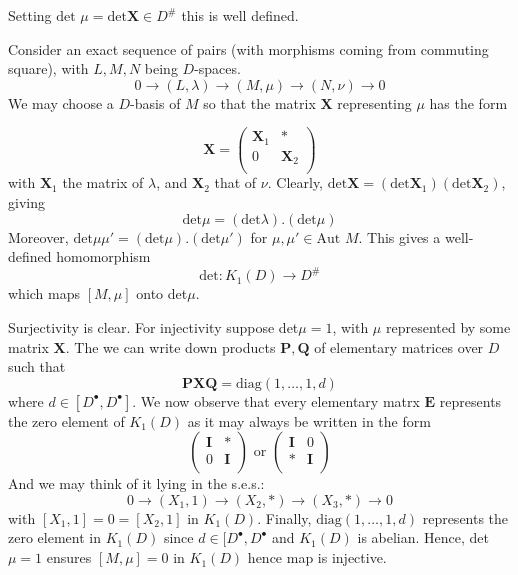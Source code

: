 Setting $\text{det }\mu = \text{det} \mathbf X \in D^{\#}$ this is well defined.

Consider an exact sequence of pairs (with morphisms coming from commuting square), with $L,M,N$ being $D$-spaces.
$$0\rightarrow (L, \lambda) \rightarrow (M, \mu) \rightarrow (N, \nu)\rightarrow 0$$
We may choose a $D$-basis of $M$ so that the matrix $\mathbf X$ representing $\mu$ has the form

$$\mathbf X = \left( \begin{array}{cc}
\mathbf X_1& *\\
0 & \mathbf X_2\\ \end{array}\right)$$
with $\mathbf X_1$ the matrix of $\lambda$, and $\mathbf X_2$ that of $\nu$. Clearly, $\text{det} \mathbf X = (\text{det} \mathbf X_1)(\text{det} \mathbf X_2)$, giving
$$\text{det} \mu = (\text{det} \lambda).(\text{det} \mu)$$
Moreover, $\text{det} \mu\mu' = (\text{det} \mu).(\text{det} \mu')$ for $\mu, \mu' \in \text{Aut }M$. This gives a well-defined homomorphism
$$\text{det}:K_1(D)\rightarrow D^{\#}$$
which maps $[M,\mu ]$ onto det$\mu$. 

Surjectivity is clear. For injectivity suppose det$\mu=1$, with $\mu$ represented by some matrix $\mathbf X$. The we can write down products $\mathbf{P,Q}$ of elementary matrices over $D$ such that
$$\mathbf{PXQ} = \text{diag} (1, \dots , 1 , d)$$ where $d\in [D^\bullet, D^\bullet]$. We now observe that every elementary matrx $\mathbf E$ represents the zero element of $K_1(D)$ as it may always be written in  the form
$$ \left( \begin{array}{cc}
\mathbf I & *\\
0 & \mathbf I\\ \end{array}\right) 
\text{ or }
\left( \begin{array}{cc}
\mathbf I& 0\\
* & \mathbf I\\ \end{array}\right)
$$
And we may think of it lying in the s.e.s.:
$$0\rightarrow (X_1, 1)\rightarrow (X_2, *)\rightarrow (X_3, *)\rightarrow 0$$
with $[X_1, 1] = 0 = [X_2, 1]$ in $K_1(D)$. Finally, $\text{diag}(1,\dots, 1,d)$ represents the zero element in $K_1(D)$ since $d\in [D^\bullet, D^\bullet$ and $K_1(D)$ is abelian. Hence, det$\mu=1$ ensures $[M,\mu] = 0$ in $K_1(D)$ hence map is injective.





